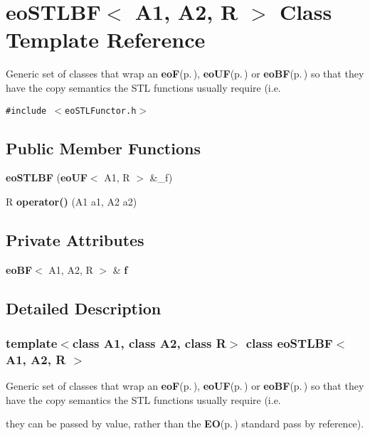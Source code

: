 \section{eo\-STLBF$<$ A1, A2, R $>$ Class Template Reference}
\label{classeo_s_t_l_b_f}
Generic set of classes that wrap an {\bf eo\-F}{\rm (p.\,\pageref{classeo_f})}, {\bf eo\-UF}{\rm (p.\,\pageref{classeo_u_f})} or {\bf eo\-BF}{\rm (p.\,\pageref{classeo_b_f})} so that they have the copy semantics the STL functions usually require (i.e.  


{\tt \#include $<$eo\-STLFunctor.h$>$}

\subsection*{Public Member Functions}
\begin{CompactItemize}
\item 
{\bf eo\-STLBF} ({\bf eo\-UF}$<$ A1, R $>$ \&\_\-f)\label{classeo_s_t_l_b_f_a0}

\item 
R {\bf operator()} (A1 a1, A2 a2)\label{classeo_s_t_l_b_f_a1}

\end{CompactItemize}
\subsection*{Private Attributes}
\begin{CompactItemize}
\item 
{\bf eo\-BF}$<$ A1, A2, R $>$ \& {\bf f}\label{classeo_s_t_l_b_f_r0}

\end{CompactItemize}


\subsection{Detailed Description}
\subsubsection*{template$<$class A1, class A2, class R$>$ class eo\-STLBF$<$ A1, A2, R $>$}

Generic set of classes that wrap an {\bf eo\-F}{\rm (p.\,\pageref{classeo_f})}, {\bf eo\-UF}{\rm (p.\,\pageref{classeo_u_f})} or {\bf eo\-BF}{\rm (p.\,\pageref{classeo_b_f})} so that they have the copy semantics the STL functions usually require (i.e. 

they can be passed by value, rather than the {\bf EO}{\rm (p.\,\pageref{class_e_o})} standard pass by reference).

